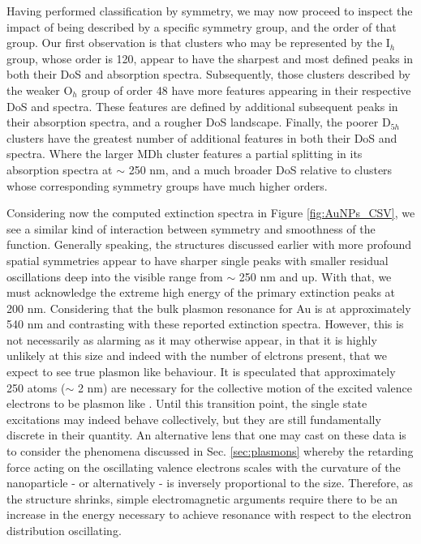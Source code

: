 Having performed classification by symmetry, we may now proceed to inspect the impact of being described by a specific symmetry group, and the order of that group. Our first observation is that clusters who may be represented by the I${_h}$ group, whose order is 120, appear to have the sharpest and most defined peaks in both their DoS and absorption spectra. Subsequently, those clusters described by the weaker O$_{h}$ group of order 48 have more features appearing in their respective DoS and spectra. These features are defined by additional subsequent peaks in their absorption spectra, and a rougher DoS landscape. Finally, the poorer D$_{5h}$ clusters have the greatest number of additional features in both their DoS and spectra. Where the larger MDh cluster features a partial splitting in its absorption spectra at $\sim$ 250 nm, and a much broader DoS relative to clusters whose corresponding symmetry groups have much higher orders.

Considering now the computed extinction spectra in Figure \ref{fig:AuNPs_CSV}, we see a similar kind of interaction between symmetry and smoothness of the function. Generally speaking, the structures discussed earlier with more profound spatial symmetries appear to have sharper single peaks with smaller residual oscillations deep into the visible range from $\sim$ 250 nm and up. With that, we must acknowledge the extreme high energy of the primary extinction peaks at 200 nm. Considering that the bulk plasmon resonance for Au is at approximately 540 nm \cite{AuPlasmonRev} and contrasting with these reported extinction spectra. However, this is not necessarily as alarming as it may otherwise appear, in that it is highly unlikely at this size and indeed with the number of elctrons present, that we expect to see true plasmon like behaviour. It is speculated that approximately 250 atoms ($\sim$ 2 nm) are necessary for the collective motion of the excited valence electrons to be plasmon like \cite{SmallPlasmonBad}. Until this transition point, the single state excitations may indeed behave collectively, but they are still fundamentally discrete in their quantity. An alternative lens that one may cast on these data is to consider the phenomena discussed in Sec. \ref{sec:plasmons} whereby the retarding force acting on the oscillating valence electrons scales with the curvature of the nanoparticle - or alternatively - is inversely proportional to the size. Therefore, as the structure shrinks, simple electromagnetic arguments require there to be an increase in the energy necessary to achieve resonance with respect to the electron distribution oscillating.


